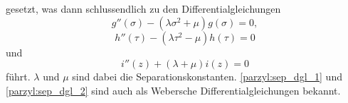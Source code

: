gesetzt, was dann schlussendlich zu den Differentialgleichungen 
\begin{equation}\label{parzyl:sep_dgl_1}
	g''(\sigma) 
	- 
	\left (
	\lambda\sigma^2
	+
	\mu 
	\right )
	g(\sigma)
	=
	0,
\end{equation}
\begin{equation}\label{parzyl:sep_dgl_2}
	h''(\tau) 
	- 
	\left (
	\lambda\tau^2
	-
	\mu 
	\right )
	h(\tau)
	=
	0
\end{equation}
und
\begin{equation}\label{parzyl:sep_dgl_3}
	i''(z) 
	+
	\left (
	\lambda
	+
	\mu 
	\right )
	i(z)
	=
	0
\end{equation}
führt. $\lambda$ und $\mu$ sind dabei die Separationskonstanten. 
\eqref{parzyl:sep_dgl_1} und \eqref{parzyl:sep_dgl_2} sind auch 
als Webersche Differentialgleichungen bekannt.



